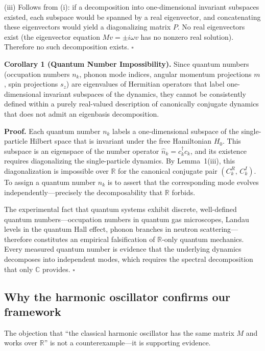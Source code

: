 \documentclass[aps,pra,preprint,groupedaddress,amsmath,amssymb,floatfix]{revtex4-2}
\begin{document}
(iii) Follows from (i): if a decomposition into one-dimensional invariant subspaces existed, each subspace would be spanned by a real eigenvector, and concatenating these eigenvectors would yield a diagonalizing matrix $P$. No real eigenvectors exist (the eigenvector equation $Mv = \pm i\omega v$ has no nonzero real solution). Therefore no such decomposition exists. $\square$

\textbf{Corollary 1 (Quantum Number Impossibility).} Since quantum numbers (occupation numbers $n_k$, phonon mode indices, angular momentum projections $m$, spin projections $s_z$) are eigenvalues of Hermitian operators that label one-dimensional invariant subspaces of the dynamics, they cannot be consistently defined within a purely real-valued description of canonically conjugate dynamics that does not admit an eigenbasis decomposition.

\textbf{Proof.} Each quantum number $n_k$ labels a one-dimensional subspace of the single-particle Hilbert space that is invariant under the free Hamiltonian $H_0$. This subspace is an eigenspace of the number operator $\hat{n}_k = c^\dagger_k c_k$, and its existence requires diagonalizing the single-particle dynamics. By Lemma~1(iii), this diagonalization is impossible over $\mathbb{R}$ for the canonical conjugate pair $(C^R_k,\,C^I_k)$. To assign a quantum number $n_k$ is to assert that the corresponding mode evolves independently---precisely the decomposability that $\mathbb{R}$ forbids.

The experimental fact that quantum systems exhibit discrete, well-defined quantum numbers---occupation numbers in quantum gas microscopes, Landau levels in the quantum Hall effect, phonon branches in neutron scattering---therefore constitutes an empirical falsification of $\mathbb{R}$-only quantum mechanics. Every measured quantum number is evidence that the underlying dynamics decomposes into independent modes, which requires the spectral decomposition that only $\mathbb{C}$ provides. $\square$

\subsection{Why the harmonic oscillator confirms our framework}
\label{sec:th1_harmonic}

The objection that ``the classical harmonic oscillator has the same matrix $M$ and works over $\mathbb{R}$'' is not a counterexample---it is supporting evidence.
\end{document}

